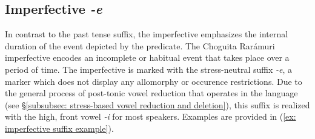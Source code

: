 \ea\label{ex: past egophoric questions}

    \label{ex: past egophoric questionsa}
        \label{ex: past egophoric questionsb}
            \label{ex: past egophoric questionsc}
    \z
\z


\subsection{Imperfective \textit{-e}}
\label{subsec: imperfective}

In contrast to the past tense suffix, the imperfective emphasizes the internal duration of the event depicted by the predicate. The Choguita Rarámuri imperfective encodes an incomplete or habitual event that takes place over a period of time. The imperfective is marked with the stress-neutral suffix \textit{-e}, a marker which does not display any allomorphy or occurence restrictions. Due to the general process of post-tonic vowel reduction that operates in the language (see §\ref{subsubsec: stress-based vowel reduction and deletion}), this suffix is realized with the high, front vowel \textit{-i} for most speakers. Examples are provided in (\ref{ex: imperfective suffix example}).

